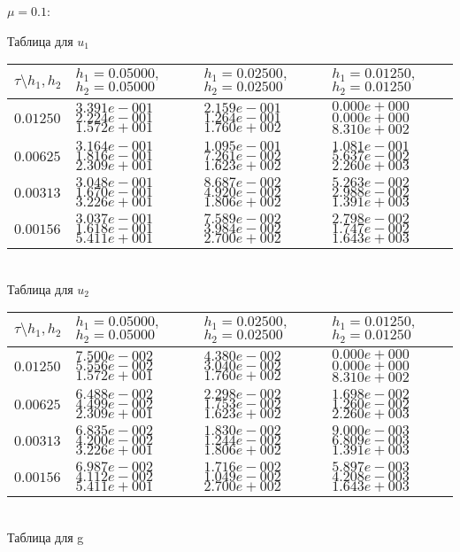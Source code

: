 \documentclass[a4paper]{article}
\theoremstyle{definition}
\numberwithin{equation}{section}
\begin{document}
\begin{center}

$\mu=0.1$: 

Таблица для $u_1$
\\[2.0ex]  
\begin{tabular}{|p{0.8in}|p{1.2in}|p{1.2in}|p{1.2in}|} \hline
$\tau\setminus h_1, h_2$ & $h_1=0.05000 ,$ $h_2=0.05000$& $h_1=0.02500 ,$ $h_2=0.02500$& $h_1=0.01250 ,$ $h_2=0.01250$\\ \hline

$0.01250$ & $3.391e-001$ $2.224e-001$ $1.572e+001$ &$2.159e-001$ $1.264e-001$ $1.760e+002$ &$0.000e+000$ $0.000e+000$ $8.310e+002$  \\ \hline
$0.00625$ & $3.164e-001$ $1.816e-001$ $2.309e+001$ &$1.095e-001$ $7.261e-002$ $1.623e+002$ &$1.081e-001$ $5.637e-002$ $2.260e+003$  \\ \hline
$0.00313$ & $3.048e-001$ $1.670e-001$ $3.226e+001$ &$8.687e-002$ $4.920e-002$ $1.806e+002$ &$5.263e-002$ $2.988e-002$ $1.391e+003$  \\ \hline
$0.00156$ & $3.037e-001$ $1.618e-001$ $5.411e+001$ &$7.589e-002$ $3.984e-002$ $2.700e+002$ &$2.798e-002$ $1.747e-002$ $1.643e+003$  \\ \hline
\end{tabular}\\[20pt]
\newpage
Таблица для $u_2$
\\[20pt] 
\begin{tabular}{|p{0.8in}|p{1.2in}|p{1.2in}|p{1.2in}|} \hline
$\tau\setminus h_1, h_2$ & $h_1=0.05000 ,$ $h_2=0.05000$& $h_1=0.02500 ,$ $h_2=0.02500$& $h_1=0.01250 ,$ $h_2=0.01250$\\ \hline

$0.01250$ & $7.500e-002$ $5.556e-002$ $1.572e+001$ &$4.380e-002$ $3.040e-002$ $1.760e+002$ &$0.000e+000$ $0.000e+000$ $8.310e+002$  \\ \hline
$0.00625$ & $6.488e-002$ $4.499e-002$ $2.309e+001$ &$2.298e-002$ $1.753e-002$ $1.623e+002$ &$1.698e-002$ $1.260e-002$ $2.260e+003$  \\ \hline
$0.00313$ & $6.835e-002$ $4.200e-002$ $3.226e+001$ &$1.830e-002$ $1.244e-002$ $1.806e+002$ &$9.000e-003$ $6.809e-003$ $1.391e+003$  \\ \hline
$0.00156$ & $6.987e-002$ $4.112e-002$ $5.411e+001$ &$1.716e-002$ $1.049e-002$ $2.700e+002$ &$5.897e-003$ $4.208e-003$ $1.643e+003$  \\ \hline
\end{tabular}\\[20pt]
\newpage
Таблица для g
 

\end{center}
\end{document}
